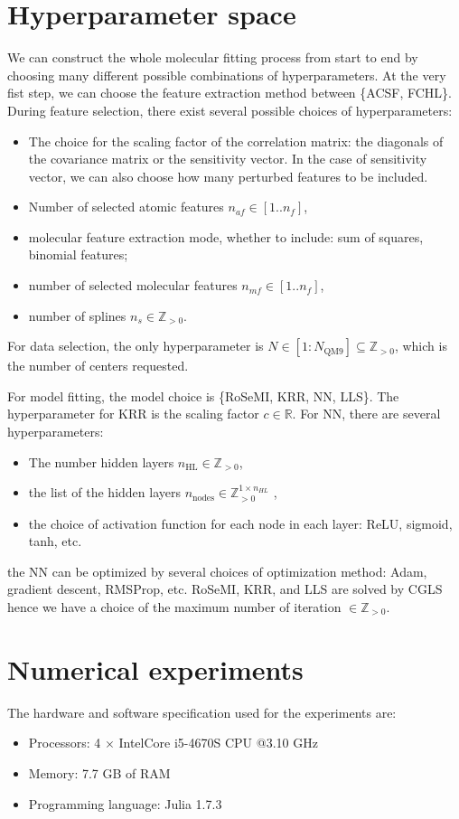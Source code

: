 \documentclass[12pt]{article}
\begin{document}
\section{Hyperparameter space}
\label{sec:hyperspace}

We can construct the whole molecular fitting process from start to end by choosing many different possible combinations of hyperparameters. At the very fist step, we can choose the feature extraction method between \{ACSF, FCHL\}. During feature selection, there exist several possible choices of hyperparameters:
\begin{itemize}
	\item The choice for the scaling factor of the correlation matrix: the diagonals of the covariance matrix or the sensitivity vector. In the case of sensitivity vector, we can also choose how many perturbed features to be included.
	\item Number of selected atomic features $n_{af} \in [1 .. n_{f}]$,
	\item molecular feature extraction mode, whether to include: sum of squares, binomial features;
	\item number of selected molecular features $n_{mf} \in [1 .. n_{f}]$,
	\item number of splines $n_{s}\in \mathbb{Z}_{>0}$.
\end{itemize}
For data selection, the only hyperparameter is $N \in [1 : N_\text{QM9}] \subseteq \mathbb{Z}_{>0}$, which is the number of centers requested. 

For model fitting, the model choice is \{RoSeMI, KRR, NN, LLS\}. The hyperparameter for KRR is the scaling factor $c \in \mathbb{R}$. For NN, there are several hyperparameters:
\begin{itemize}
	\item The number hidden layers $n_\text{HL} \in \mathbb{Z}_{>0}$,
	\item the list of the hidden layers $n_\text{nodes} \in \mathbb{Z}^{1 \times n_{HL}}_{>0}$ ,
	\item the choice of activation function for each node in each layer: ReLU, sigmoid, tanh, etc.
\end{itemize}
the NN can be optimized by several choices of optimization method: Adam, gradient descent, RMSProp, etc. RoSeMI, KRR, and LLS are solved by CGLS hence we have a choice of the maximum number of iteration  $\in \mathbb{Z}_{>0}$.

\section{Numerical experiments}
The hardware and software specification used for the experiments are:
\begin{itemize}
	\item Processors: 4 $\times$ Intel\textregistered Core i5-4670S CPU @3.10 GHz
	\item Memory: 7.7 GB of RAM
	\item Programming language: Julia 1.7.3
\end{itemize}
\end{document}
